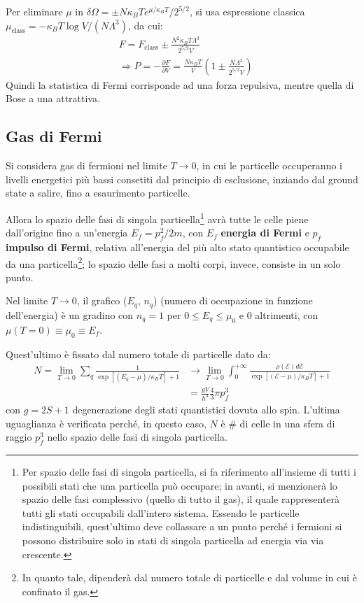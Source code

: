 \documentclass[10pt, a4paper]{scrartcl}
\numberwithin{equation}{subsection}
\theoremstyle{style1}
\begin{document}
Per eliminare $\mu $ in $\delta \Omega  = \pm N\kappa _B Te^{\mu  / \kappa _B T} / 2^{5 / 2} $, si usa espressione classica $\mu _\text{class}= - \kappa _B T \log V /(N\Lambda ^3)$, da cui:
\begin{equation}
	\begin{split}
		&F = F_\text{class} \pm \frac{N^2 \kappa _B T \Lambda ^3}{2^{5 / 2}V }\\
		& \Rightarrow P = - \frac{\partial F }{\partial V } = \frac{N\kappa _B T}{V}\left(1 \pm \frac{N\Lambda ^3}{2^{5 / 2} V}\right) 
	\end{split}
\end{equation}
Quindi la statistica di Fermi corrisponde ad una forza repulsiva, mentre quella di Bose a una attrattiva.
\subsection{Gas di Fermi}

Si considera gas di fermioni nel limite $T \to 0 $, in cui le particelle occuperanno i livelli energetici pi\`u bassi consetiti dal principio di esclusione, inziando dal ground state a salire, fino a esaurimento particelle. 

Allora lo spazio delle fasi di singola particella\footnote{Per spazio delle fasi di singola particella, si fa riferimento all'insieme di tutti i possibili stati che una particella pu\`o occupare; in avanti, si menzioner\`a lo spazio delle fasi complessivo (quello di tutto il gas), il quale rappresenter\`a tutti gli stati occupabili dall'intero sistema. Essendo le particelle indistinguibili, quest'ultimo deve collassare a un punto perch\'e i fermioni si possono distribuire solo in stati di singola particella ad energia via via crescente.} avr\`a tutte le celle piene dall'origine fino a un'energia $E_f = p_f^2 / 2m$, con $E_f$ \textbf{energia di Fermi} e $p_f$ \textbf{impulso di Fermi}, relativa all'energia del pi\`u alto stato quantistico occupabile da una particella\footnote{In quanto tale, dipender\`a dal numero totale di particelle e dal volume in cui è confinato il gas.}; lo spazio delle fasi a molti corpi, invece, consiste in un solo punto.

Nel limite $T\to 0$, il grafico ($E_q$, $n_q$) (numero di occupazione in funzione dell'energia) \`e un gradino con $n_q = 1$ per $0\le E_q\le \mu_0$ e $0$ altrimenti, con $\mu (T=0) \equiv \mu_{0}\equiv E_f$.

Quest'ultimo \`e fissato dal numero totale di particelle dato da:
\begin{equation}
	\begin{split}
		N = \lim_{T \to 0} \sum_{q}^{} \frac{1}{\exp\left[ (E_q - \mu  ) / \kappa _B T \right]  + 1 } &\to \lim_{T \to 0 } \int_{0} ^{+\infty} \frac{\rho (\mathscr{E})d \mathscr{E}}{\exp\left[ (\mathscr{E}-\mu ) / \kappa _B T \right] + 1}\\
		  & =  \frac{gV}{h^3}\frac{4}{3}\pi p^3_f
	\end{split}
\end{equation}
con $g = 2S + 1$ degenerazione degli stati quantistici dovuta allo spin. L'ultima uguaglianza \`e verificata perch\'e, in questo caso, $N$ \`e \# di celle in una sfera di raggio $p_f^3$ nello spazio delle fasi di singola particella. 
\end{document}
